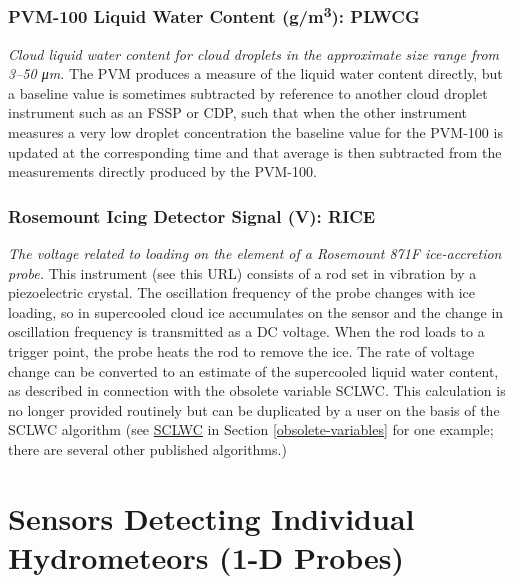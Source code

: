 \documentclass[
]{book}
\begin{document}
\hypertarget{plwcg}{%
\subsubsection*{\texorpdfstring{PVM-100 Liquid Water Content (g/m\textsuperscript{3}): PLWCG}{PVM-100 Liquid Water Content (g/m3): PLWCG}}\label{plwcg}}

\emph{Cloud liquid water content for cloud droplets in the approximate size range from 3--50 {\emph{μ}}m.} The PVM produces a measure of the liquid water content directly, but a baseline value is sometimes subtracted by reference to another cloud droplet instrument such as an FSSP or CDP, such that when the other instrument measures a very low droplet concentration the baseline value for the PVM-100 is updated at the corresponding time and that average is then subtracted from the measurements directly produced by the PVM-100.

\hypertarget{rice}{%
\subsubsection*{Rosemount Icing Detector Signal (V): RICE}\label{rice}}

\emph{The voltage related to loading on the element of a Rosemount 871F ice-accretion probe.} This instrument (see this URL) consists of a rod set in vibration by a piezoelectric crystal. The oscillation frequency of the probe changes with ice loading, so in supercooled cloud ice accumulates on the sensor and the change in oscillation frequency is transmitted as a DC voltage. When the rod loads to a trigger point, the probe heats the rod to remove the ice. The rate of voltage change can be converted to an estimate of the supercooled liquid water content, as described in connection with the obsolete variable SCLWC. This calculation is no longer provided routinely but can be duplicated by a user on the basis of the SCLWC algorithm (see \protect\hyperlink{SCLWC}{SCLWC} in Section \ref{obsolete-variables} for one example; there are several other published algorithms.)

\hypertarget{sensors-1-D-probes}{%
\section{Sensors Detecting Individual Hydrometeors (1-D Probes)}\label{sensors-1-D-probes}}
\end{document}
